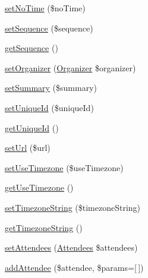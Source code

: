\begin{DoxyCompactItemize}
\item 
\mbox{\hyperlink{class_eluceo_1_1i_cal_1_1_component_1_1_event_a313bef4a402da42f644ac0dc3bafe586}{set\+No\+Time}} (\$no\+Time)
\item 
\mbox{\hyperlink{class_eluceo_1_1i_cal_1_1_component_1_1_event_a87725eac37817e617abbe6d1910790e9}{set\+Sequence}} (\$sequence)
\item 
\mbox{\hyperlink{class_eluceo_1_1i_cal_1_1_component_1_1_event_a5fd79e07365d5e382196df5dc0cf6f16}{get\+Sequence}} ()
\item 
\mbox{\hyperlink{class_eluceo_1_1i_cal_1_1_component_1_1_event_a62d9b8061a582bb16162bea9d5ddbb40}{set\+Organizer}} (\mbox{\hyperlink{class_eluceo_1_1i_cal_1_1_property_1_1_event_1_1_organizer}{Organizer}} \$organizer)
\item 
\mbox{\hyperlink{class_eluceo_1_1i_cal_1_1_component_1_1_event_ad632fd01f9c5094a1e705c21fc1dddf1}{set\+Summary}} (\$summary)
\item 
\mbox{\hyperlink{class_eluceo_1_1i_cal_1_1_component_1_1_event_ad71076351bbd5720b266b021d92d61cc}{set\+Unique\+Id}} (\$unique\+Id)
\item 
\mbox{\hyperlink{class_eluceo_1_1i_cal_1_1_component_1_1_event_aeb367010876c6f9a015f86e392512da0}{get\+Unique\+Id}} ()
\item 
\mbox{\hyperlink{class_eluceo_1_1i_cal_1_1_component_1_1_event_a35034248d6c68ad41e8cd70e6ba17481}{set\+Url}} (\$url)
\item 
\mbox{\hyperlink{class_eluceo_1_1i_cal_1_1_component_1_1_event_a73e24367751af65fcda2366c9df77409}{set\+Use\+Timezone}} (\$use\+Timezone)
\item 
\mbox{\hyperlink{class_eluceo_1_1i_cal_1_1_component_1_1_event_a322c6d3a65538cec8a4e1929439f4e0b}{get\+Use\+Timezone}} ()
\item 
\mbox{\hyperlink{class_eluceo_1_1i_cal_1_1_component_1_1_event_aad35266e1a18bcc58e56980ded6dddb6}{set\+Timezone\+String}} (\$timezone\+String)
\item 
\mbox{\hyperlink{class_eluceo_1_1i_cal_1_1_component_1_1_event_ad3838312a846ff44aaff17664a2bd97f}{get\+Timezone\+String}} ()
\item 
\mbox{\hyperlink{class_eluceo_1_1i_cal_1_1_component_1_1_event_a3862ad4e3fc4d0f8d7086f4889b11bd7}{set\+Attendees}} (\mbox{\hyperlink{class_eluceo_1_1i_cal_1_1_property_1_1_event_1_1_attendees}{Attendees}} \$attendees)
\item 
\mbox{\hyperlink{class_eluceo_1_1i_cal_1_1_component_1_1_event_aad2a226b84a661e22880f1d957b87483}{add\+Attendee}} (\$attendee, \$params=\mbox{[}$\,$\mbox{]})

\end{DoxyCompactItemize}
